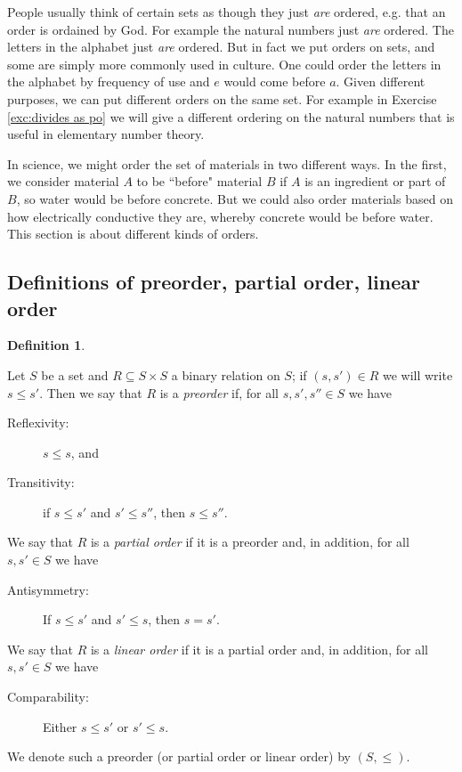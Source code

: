\documentclass{book}
\def\ss{\subseteq}
\theoremstyle{remark}
\theoremstyle{definition}
\newtheorem{definition}[subsubsection]{Definition}
\begin{document}
People usually think of certain sets as though they just {\em are} ordered, e.g. that an order is ordained by God. For example the natural numbers just {\em are} ordered. The letters in the alphabet just {\em are} ordered. But in fact we put orders on sets, and some are simply more commonly used in culture. One could order the letters in the alphabet by frequency of use and $e$ would come before $a$. Given different purposes, we can put different orders on the same set. For example in Exercise \ref{exc:divides as po} we will give a different ordering on the natural numbers that is useful in elementary number theory.

In science, we might order the set of materials in two different ways. In the first, we consider material $A$ to be ``before" material $B$ if $A$ is an ingredient or part of $B$, so water would be before concrete. But we could also order materials based on how electrically conductive they are, whereby concrete would be before water. This section is about different kinds of orders.


\subsection{Definitions of preorder, partial order, linear order}

\begin{definition}\label{def:orders}

Let $S$ be a set and $R\ss S\times S$ a binary relation on $S$; if $(s,s')\in R$ we will write $s\leq s'$. Then we say that $R$ is a {\em preorder} if, for all $s,s',s''\in S$ we have
\begin{description}
\item[Reflexivity:] $s\leq s$, and
\item[Transitivity:] if $s\leq s'$ and $s'\leq s''$, then $s\leq s''$.
\end{description}
We say that $R$ is a {\em partial order} if it is a preorder and, in addition, for all $s,s'\in S$ we have
\begin{description}
\item[Antisymmetry:] If $s\leq s'$ and $s'\leq s$, then $s=s'$.
\end{description}
We say that $R$ is a {\em linear order} if it is a partial order and, in addition, for all $s,s'\in S$ we have
\begin{description}
\item[Comparability:] Either $s\leq s'$ or $s'\leq s$.
\end{description}
We denote such a preorder (or partial order or linear order) by $(S,\leq)$.
\end{definition}
\end{document}
